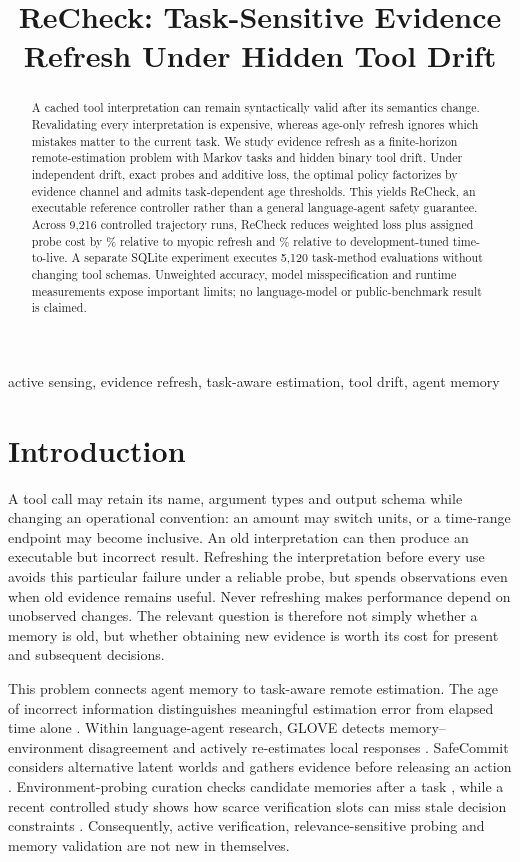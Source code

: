 \documentclass[10pt,letterpaper]{article}
\title{ReCheck: Task-Sensitive Evidence Refresh Under Hidden Tool Drift}
\begin{document}
\maketitle
\begin{abstract}
A cached tool interpretation can remain syntactically valid after its semantics change. Revalidating every interpretation is expensive, whereas age-only refresh ignores which mistakes matter to the current task. We study evidence refresh as a finite-horizon remote-estimation problem with Markov tasks and hidden binary tool drift. Under independent drift, exact probes and additive loss, the optimal policy factorizes by evidence channel and admits task-dependent age thresholds. This yields ReCheck, an executable reference controller rather than a general language-agent safety guarantee. Across 9,216 controlled trajectory runs, ReCheck reduces weighted loss plus assigned probe cost by \RCReductionMyopic\% relative to myopic refresh and \RCReductionTTL\% relative to development-tuned time-to-live. A separate SQLite experiment executes 5,120 task-method evaluations without changing tool schemas. Unweighted accuracy, model misspecification and runtime measurements expose important limits; no language-model or public-benchmark result is claimed.
\end{abstract}
\begin{keywords}
active sensing, evidence refresh, task-aware estimation, tool drift, agent memory
\end{keywords}

\section{Introduction}
A tool call may retain its name, argument types and output schema while changing an operational convention: an amount may switch units, or a time-range endpoint may become inclusive. An old interpretation can then produce an executable but incorrect result. Refreshing the interpretation before every use avoids this particular failure under a reliable probe, but spends observations even when old evidence remains useful. Never refreshing makes performance depend on unobserved changes. The relevant question is therefore not simply whether a memory is old, but whether obtaining new evidence is worth its cost for present and subsequent decisions.

This problem connects agent memory to task-aware remote estimation. The age of incorrect information distinguishes meaningful estimation error from elapsed time alone \cite{aoii}. Within language-agent research, GLOVE detects memory--environment disagreement and actively re-estimates local responses \cite{glove}. SafeCommit considers alternative latent worlds and gathers evidence before releasing an action \cite{safecommit}. Environment-probing curation checks candidate memories after a task \cite{grounding}, while a recent controlled study shows how scarce verification slots can miss stale decision constraints \cite{stale}. Consequently, active verification, relevance-sensitive probing and memory validation are not new in themselves.
\end{document}

